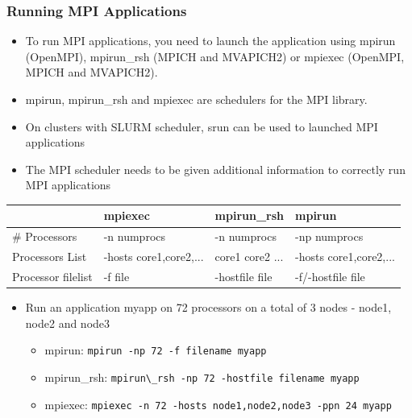 \documentclass[10pt,t]{beamer}
\begin{document}
\begin{frame}
  \frametitle{Running MPI Applications}
  \begin{itemize}
  \item To run MPI applications, you need to launch the application using mpirun (OpenMPI), mpirun\_rsh (MPICH and MVAPICH2) or mpiexec (OpenMPI, MPICH and MVAPICH2).
  \item mpirun, mpirun\_rsh and mpiexec are schedulers for the MPI library.
  \item On clusters with SLURM scheduler, srun can be used to launched MPI applications
  \item The MPI scheduler needs to be given additional information to correctly run MPI applications
  \end{itemize}
  \begin{center}
    \begin{tabular}{|faaa|}
      \hline
      & mpiexec & mpirun\_rsh & mpirun \\
      \hline
      \# Processors & -n numprocs & -n numprocs & -np numprocs \\
      Processors List & -hosts core1,core2,... & core1 core2 ... & -hosts core1,core2,... \\
      Processor filelist & -f file & -hostfile file & -f/-hostfile file \\
      \hline
    \end{tabular}
  \end{center}
  \begin{itemize}
    \item Run an application myapp on 72 processors on a total of 3 nodes - node1, node2 and node3 
      \begin{itemize}
        \item mpirun: \lstinline|mpirun -np 72 -f filename myapp|
        \item mpirun\_rsh: \lstinline|mpirun\_rsh -np 72 -hostfile filename myapp|
        \item mpiexec: \lstinline|mpiexec -n 72 -hosts node1,node2,node3 -ppn 24 myapp|
      \end{itemize}
  \end{itemize}
\end{frame}
\end{document}
